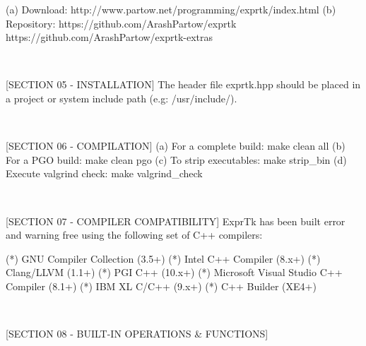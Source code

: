 (a) Download:   http://www.partow.net/programming/exprtk/index.html
(b) Repository: https://github.com/ArashPartow/exprtk
https://github.com/ArashPartow/exprtk-extras

~~~~~~~~~~~~~~~~~~~~~~~~~~~~~~~~~~~~~~~~~~~~~~~~~~~~~~~~~~

[SECTION 05 - INSTALLATION]
The header  file exprtk.hpp  should be  placed in a project or  system
include path (e.g: /usr/include/).

~~~~~~~~~~~~~~~~~~~~~~~~~~~~~~~~~~~~~~~~~~~~~~~~~~~~~~~~~~

[SECTION 06 - COMPILATION]
(a) For a complete build: make clean all
(b) For a PGO build: make clean pgo
(c) To strip executables: make strip\_bin
(d) Execute valgrind check: make valgrind\_check

~~~~~~~~~~~~~~~~~~~~~~~~~~~~~~~~~~~~~~~~~~~~~~~~~~~~~~~~~~

[SECTION 07 - COMPILER COMPATIBILITY]
ExprTk has been built error and warning free using the following set
of C++ compilers:

(*) GNU Compiler Collection (3.5+)
(*) Intel C++ Compiler (8.x+)
(*) Clang/LLVM (1.1+)
(*) PGI C++ (10.x+)
(*) Microsoft Visual Studio C++ Compiler (8.1+)
(*) IBM XL C/C++ (9.x+)
(*) C++ Builder (XE4+)

~~~~~~~~~~~~~~~~~~~~~~~~~~~~~~~~~~~~~~~~~~~~~~~~~~~~~~~~~~

[SECTION 08 - BUILT-IN OPERATIONS \& FUNCTIONS]

